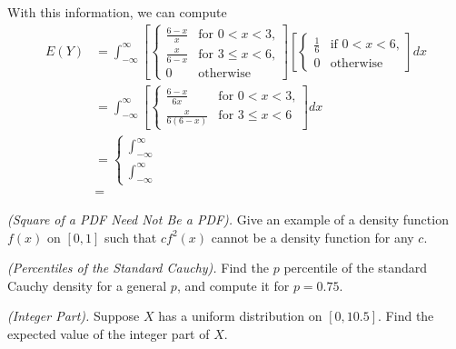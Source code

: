 \begin{solution}
  With this information, we can compute
  \begin{align*}
    E(Y)
    &=\int_{-\infty}^\infty
     \left[
      \begin{cases}
        \frac{6-x}{x}&\text{for \(0<x<3\),}\\
        \frac{x}{6-x}&\text{for \(3\leq x<6\),}\\
        0&\text{otherwise}
      \end{cases}\right]
      \left[
      \begin{cases}
      \frac{1}{6}&\text{if \(0<x<6\),}\\
      0&\text{otherwise}
      \end{cases}
     \right]dx\\
    &=\int_{-\infty}^\infty
    \left[
    \begin{cases}
    \frac{6-x}{6x}&\text{for \(0<x<3\),}\\
    \frac{x}{6(6-x)}&\text{for \(3\leq x<6\)}
    \end{cases}
    \right]dx\\
    &=
      \begin{cases}
        \int_{-\infty}^\infty\\
        \int_{-\infty}^\infty
      \end{cases}\\
    &=
  \end{align*}
\end{solution}
\newpage

\begin{problem}[Handout 12, \# 20]
  \emph{(Square of a PDF Need Not Be a PDF).} Give an example of a density
  function \(f(x)\) on \([0,1]\) such that \(cf^2(x)\) cannot be a density
  function for any \(c\).
\end{problem}
\begin{solution}

\end{solution}
\newpage

\begin{problem}[Handout 12, \# 21]
  \emph{(Percentiles of the Standard Cauchy).} Find the \(p\)
  percentile of the standard Cauchy density for a general \(p\), and
  compute it for \(p=0.75\).
\end{problem}
\begin{solution}

\end{solution}
\newpage

\begin{problem}[Handout 12, \# 22]
  \emph{(Integer Part).} Suppose \(X\) has a uniform distribution on
  \([0,10.5]\). Find the expected value of the integer part of \(X\).
\end{problem}
\begin{solution}

\end{solution}
\newpage

